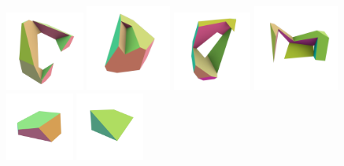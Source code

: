 \documentclass[11pt, oneside]{amsart}   	%
\begin{document}
\begin{figure}[htbp]
   \includegraphics[width=0.23\textwidth]{images/0008.png}\hspace{-9mm}%
   \includegraphics[width=0.25\textwidth]{images/0009.png}\hspace{-9mm}%
   \includegraphics[width=0.23\textwidth]{images/0010.png}\hspace{-7mm}%
   \includegraphics[width=0.25\textwidth]{images/0011.png}%
\vspace{-6mm}      
   \includegraphics[width=0.20\textwidth]{images/0012.png}%
   \includegraphics[width=0.20\textwidth]{images/0013.png}%

\end{figure}
\end{document}
